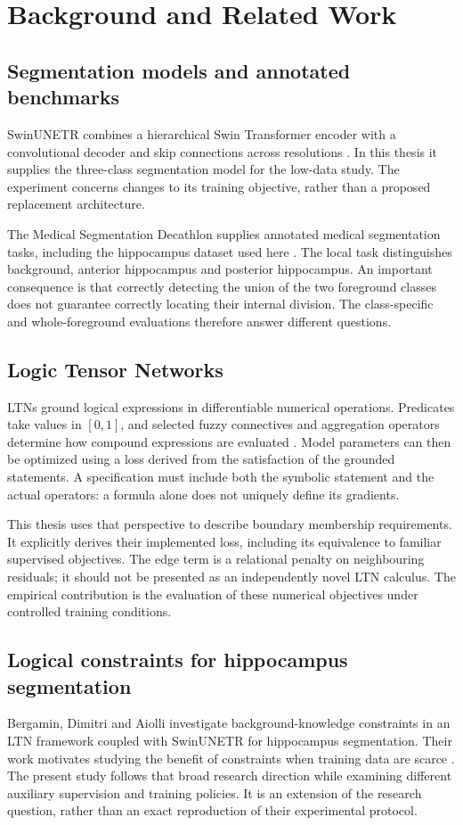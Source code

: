 \section{Background and Related Work}\label{sec:literature}
\subsection{Segmentation models and annotated benchmarks}
SwinUNETR combines a hierarchical Swin Transformer encoder with a convolutional decoder and skip connections across resolutions \cite{hatamizadeh2022swin}. In this thesis it supplies the three-class segmentation model for the low-data study. The experiment concerns changes to its training objective, rather than a proposed replacement architecture.

The Medical Segmentation Decathlon supplies annotated medical segmentation tasks, including the hippocampus dataset used here \cite{simpson2019dataset}. The local task distinguishes background, anterior hippocampus and posterior hippocampus. An important consequence is that correctly detecting the union of the two foreground classes does not guarantee correctly locating their internal division. The class-specific and whole-foreground evaluations therefore answer different questions.

\subsection{Logic Tensor Networks}
LTNs ground logical expressions in differentiable numerical operations. Predicates take values in $[0,1]$, and selected fuzzy connectives and aggregation operators determine how compound expressions are evaluated \cite{badreddine2022logic}. Model parameters can then be optimized using a loss derived from the satisfaction of the grounded statements. A specification must include both the symbolic statement and the actual operators: a formula alone does not uniquely define its gradients.

This thesis uses that perspective to describe boundary membership requirements. It explicitly derives their implemented loss, including its equivalence to familiar supervised objectives. The edge term is a relational penalty on neighbouring residuals; it should not be presented as an independently novel LTN calculus. The empirical contribution is the evaluation of these numerical objectives under controlled training conditions.

\subsection{Logical constraints for hippocampus segmentation}
Bergamin, Dimitri and Aiolli investigate background-knowledge constraints in an LTN framework coupled with SwinUNETR for hippocampus segmentation. Their work motivates studying the benefit of constraints when training data are scarce \cite{bergamin2025integrating}. The present study follows that broad research direction while examining different auxiliary supervision and training policies. It is an extension of the research question, rather than an exact reproduction of their experimental protocol.

